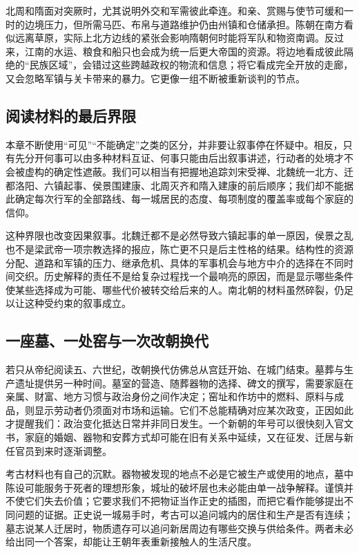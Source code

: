 北周和隋面对突厥时，尤其说明外交和军需彼此牵连。和亲、赏赐与使节可缓和一时的边境压力，但所需马匹、布帛与道路维护仍由州镇和仓储承担。陈朝在南方看似远离草原，实际上北方边线的紧张会影响隋朝何时能将军队和物资南调。反过来，江南的水运、粮食和船只也会成为统一后更大帝国的资源。将边地看成彼此隔绝的“民族区域”，会错过这些跨越政权的物流和信息；将它看成完全开放的走廊，又会忽略军镇与关卡带来的暴力。它更像一组不断被重新谈判的节点。

\subsection{阅读材料的最后界限}

本章不断使用“可见”“不能确定”之类的区分，并非要让叙事停在怀疑中。相反，只有先分开何事可以由多种材料互证、何事只能由后出叙事讲述，行动者的处境才不会被虚构的确定性遮蔽。我们可以相当有把握地追踪刘宋受禅、北魏统一北方、迁都洛阳、六镇起事、侯景围建康、北周灭齐和隋入建康的前后顺序；我们却不能据此确定每次行军的全部路线、每一城居民的态度、每项制度的覆盖率或每个家庭的信仰。

这种界限也改变因果叙事。北魏迁都不是必然导致六镇起事的单一原因，侯景之乱也不是梁武帝一项宗教选择的报应，陈亡更不只是后主性格的结果。结构性的资源分配、道路和军镇的压力、继承危机、具体的军事机会与地方中介的选择在不同时间交织。历史解释的责任不是给复杂过程找一个最响亮的原因，而是显示哪些条件使某些选择成为可能、哪些代价被转交给后来的人。南北朝的材料虽然碎裂，仍足以让这种受约束的叙事成立。

\subsection{一座墓、一处窑与一次改朝换代}

若只从帝纪阅读五、六世纪，改朝换代仿佛总从宫廷开始、在城门结束。墓葬与生产遗址提供另一种时间。墓室的营造、随葬器物的选择、碑文的撰写，需要家庭在亲属、财富、地方习惯与政治身份之间作决定；窑址和作坊中的燃料、原料与成品，则显示劳动者仍须面对市场和运输。它们不总能精确对应某次政变，正因如此才提醒我们：政治变化抵达日常并非同日发生。一个新朝的年号可以很快刻入官文书，家庭的婚姻、器物和安葬方式却可能在旧有关系中延续，又在征发、迁居与新任官员到来时逐渐调整。

考古材料也有自己的沉默。器物被发现的地点不必是它被生产或使用的地点，墓中陈设可能服务于死者的理想形象，城址的破坏层也未必能由单一战争解释。谨慎并不使它们失去价值；它要求我们不把物证当作正史的插图，而把它看作能够提出不同问题的证据。正史说一城易手时，考古可以追问城内的居住和生产是否有连续；墓志说某人迁居时，物质遗存可以追问新居周边有哪些交换与供给条件。两者未必给出同一个答案，却能让王朝年表重新接触人的生活尺度。

